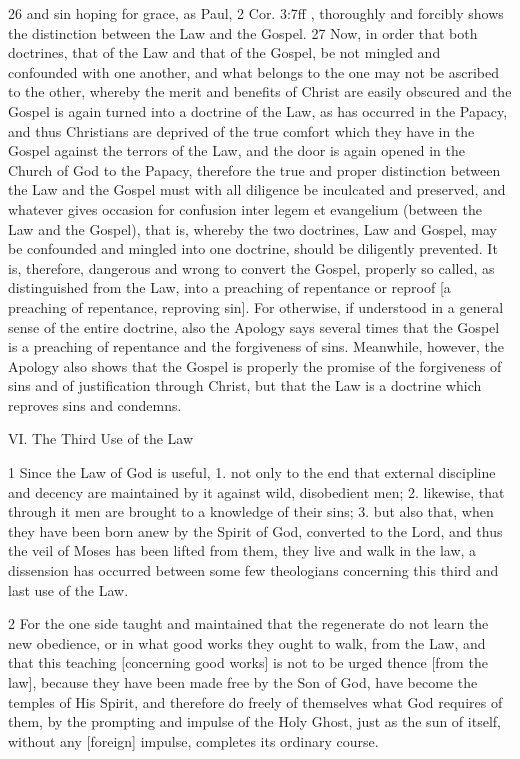 26 and sin hoping for grace, as Paul, 2 Cor. 3:7ff , thoroughly and forcibly shows the distinction between the Law and the Gospel.
27 Now, in order that both doctrines, that of the Law and that of the Gospel, be not mingled and confounded with one another, and what belongs to the one may not be ascribed to the other, whereby the merit and benefits of Christ are easily obscured and the Gospel is again turned into a doctrine of the Law, as has occurred in the Papacy, and thus Christians are deprived of the true comfort which they have in the Gospel against the terrors of the Law, and the door is again opened in the Church of God to the Papacy, therefore the true and proper distinction between the Law and the Gospel must with all diligence be inculcated and preserved, and whatever gives occasion for confusion inter legem et evangelium (between the Law and the Gospel), that is, whereby the two doctrines, Law and Gospel, may be confounded and mingled into one doctrine, should be diligently prevented. It is, therefore, dangerous and wrong to convert the Gospel, properly so called, as distinguished from the Law, into a preaching of repentance or reproof [a preaching of repentance, reproving sin]. For otherwise, if understood in a general sense of the entire doctrine, also the Apology says several times that the Gospel is a preaching of repentance and the forgiveness of sins. Meanwhile, however, the Apology also shows that the Gospel is properly the promise of the forgiveness of sins and of justification through Christ, but that the Law is a doctrine which reproves sins and condemns.

VI. The Third Use of the Law

1 Since the Law of God is useful, 1. not only to the end that external discipline and decency are maintained by it against wild, disobedient men; 2. likewise, that through it men are brought to a knowledge of their sins; 3. but also that, when they have been born anew by the Spirit of God, converted to the Lord, and thus the veil of Moses has been lifted from them, they live and walk in the law, a dissension has occurred between some few theologians concerning this third and last use of the Law.

2 For the one side taught and maintained that the regenerate do not learn the new obedience, or in what good works they ought to walk, from the Law, and that this teaching [concerning good works] is not to be urged thence [from the law], because they have been made free by the Son of God, have become the temples of His Spirit, and therefore do freely of themselves what God requires of them, by the prompting and impulse of the Holy Ghost, just as the sun of itself, without any [foreign] impulse, completes its ordinary course.

